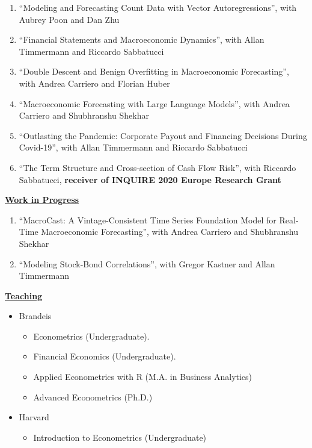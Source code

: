 \documentclass[12pt]{article}
\begin{document}
\begin{enumerate}[resume]
	
	\item ``Modeling and Forecasting Count Data with Vector Autoregressions'', with Aubrey Poon and Dan Zhu
	
	\item ``Financial Statements and Macroeconomic Dynamics'', with Allan Timmermann and Riccardo Sabbatucci
	
	\item ``Double Descent and Benign Overfitting in Macroeconomic Forecasting'', with Andrea Carriero and Florian Huber

	\item ``Macroeconomic Forecasting with Large Language Models'', with Andrea Carriero and Shubhranshu Shekhar

	\item ``Outlasting the Pandemic: Corporate Payout and Financing Decisions During Covid-19'', with Allan Timmermann and Riccardo Sabbatucci
	
	\item ``The Term Structure and Cross-section of Cash Flow Risk'', with Riccardo Sabbatucci, \textbf{receiver of INQUIRE 2020 Europe Research Grant} 
\end{enumerate}
\underline{\textbf{Work in Progress}}
\begin{enumerate}[resume]
		\item ``MacroCast: A Vintage-Consistent Time Series Foundation Model for Real-Time Macroeconomic Forecasting'', with Andrea Carriero and Shubhranshu Shekhar
	\item ``Modeling Stock-Bond Correlations'', with Gregor Kastner and Allan Timmermann
	
	
\end{enumerate}
\underline{\textbf{Teaching}}
\begin{itemize}
	\item Brandeis
	\begin{itemize}
		\item Econometrics (Undergraduate).
		\item Financial Economics (Undergraduate). 
		\item Applied Econometrics with R (M.A. in Business Analytics) 
		\item Advanced Econometrics (Ph.D.)
	\end{itemize}
\item Harvard
	\begin{itemize}
		\item Introduction to Econometrics (Undergraduate)
	\end{itemize}
\end{itemize}
\end{document}
